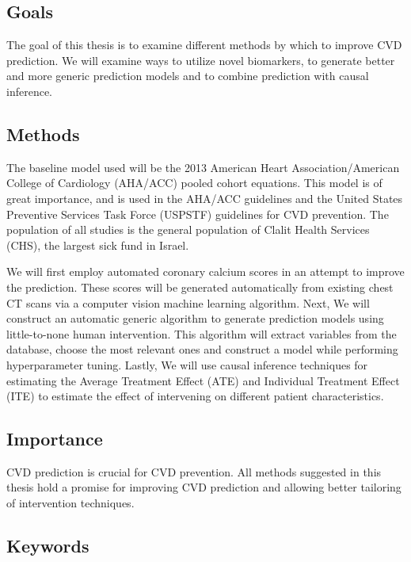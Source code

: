 \documentclass[a4paper,12pt]{article}
\begin{document}
		\subsection{Goals}
		
		The goal of this thesis is to examine different methods by which to improve CVD prediction. We will examine ways to utilize novel biomarkers, to generate better and more generic prediction models and to combine prediction with causal inference.
		
		\subsection{Methods}
		
		The baseline model used will be the 2013 American Heart Association/American College of Cardiology (AHA/ACC) pooled cohort equations\cite{Goff2014}. This model is of great importance, and is used in the AHA/ACC guidelines and the United States Preventive Services Task Force (USPSTF) guidelines for CVD prevention\cite{Bibbins-Domingo2016}. The population of all studies is the general population of Clalit Health Services (CHS), the largest sick fund in Israel.
		
		We will first employ automated coronary calcium scores in an attempt to improve the prediction. These scores will be generated automatically from existing chest CT scans via a computer vision machine learning algorithm. Next, We will construct an automatic generic algorithm to generate prediction models using little-to-none human intervention. This algorithm will extract variables from the database, choose the most relevant ones and construct a model while performing hyperparameter tuning. Lastly, We will use causal inference techniques for estimating the Average Treatment Effect (ATE) and Individual Treatment Effect (ITE) to estimate the effect of intervening on different patient characteristics.
		
		\subsection{Importance}
		
		CVD prediction is crucial for CVD prevention. All methods suggested in this thesis hold a promise for improving CVD prediction and allowing better tailoring of intervention techniques.
		
		\subsection{Keywords}
		
\end{document}
